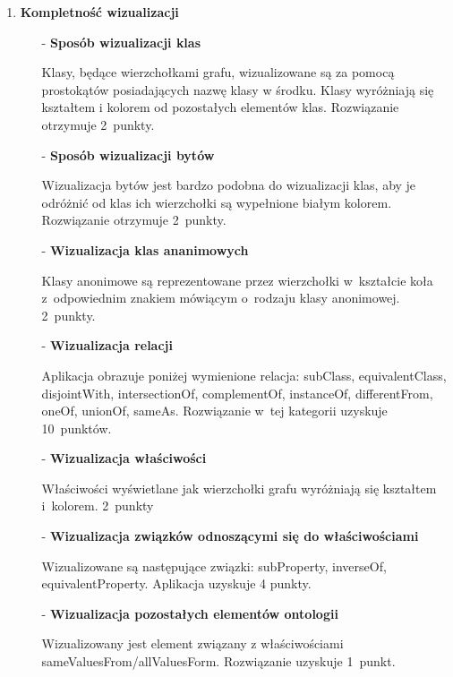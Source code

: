 \begin{enumerate}
 \item{\bf Kompletność wizualizacji}

  \begin{itemize}
   \item[-]{\bf Sposób wizualizacji klas}

  \nopagebreak  

Klasy, będące wierzchołkami grafu, wizualizowane są za pomocą prostokątów posiadających nazwę klasy w środku. Klasy wyróżniają się kształtem 
i kolorem od pozostałych elementów klas.  Rozwiązanie otrzymuje 2~punkty.


   \item[-]{\bf Sposób wizualizacji bytów}

  \nopagebreak 
Wizualizacja bytów jest bardzo podobna do wizualizacji klas, aby je odróżnić od klas ich wierzchołki są wypełnione białym kolorem.
Rozwiązanie otrzymuje 2~punkty. 


   \item[-]{\bf Wizualizacja klas ananimowych}

  \nopagebreak 
Klasy anonimowe są reprezentowane przez wierzchołki w~kształcie koła z~odpowiednim znakiem mówiącym o~rodzaju klasy anonimowej. 2~punkty.


   \item[-]{\bf Wizualizacja relacji}

  \nopagebreak 
Aplikacja obrazuje poniżej wymienione relacja:  subClass, equivalentClass, disjointWith, intersectionOf, complementOf, instanceOf, differentFrom,  
oneOf, unionOf, sameAs. Rozwiązanie w~tej kategorii uzyskuje 10~punktów.



 \item[-]{\bf Wizualizacja właściwości} 

  \nopagebreak
Właściwości wyświetlane jak wierzchołki grafu wyróżniają się kształtem i~kolorem. 2~punkty

 \item[-]{\bf Wizualizacja związków odnoszącymi się do właściwościami} 

  \nopagebreak
Wizualizowane są następujące związki: subProperty, inverseOf, equivalentProperty. Aplikacja uzyskuje 4 punkty.
 \item[-]{\bf Wizualizacja pozostałych elementów ontologii} 

  \nopagebreak
Wizualizowany jest element związany z właściwościami sameValuesFrom/allValuesForm. Rozwiązanie uzyskuje 1~punkt.
  \end{itemize}


\end{enumerate}
